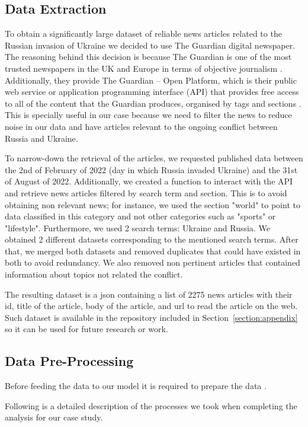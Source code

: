 \documentclass[twoside,12pt,a4paper]{article}
\begin{document}
\subsection{Data Extraction}
To obtain a significantly large dataset of reliable news articles related to the Russian invasion of Ukraine we decided to use The Guardian digital newspaper. The reasoning behind this decision is because The Guardian is one of the most trusted newspapers in the UK and Europe in terms of objective journalism \citep{matsa_western_2018}. Additionally, they provide The Guardian – Open Platform, which is their public web service or application programming interface (API) that provides free access to all of the content that the Guardian produces, organised by tags and sections \citep{noauthor_theguardian_nodate}. This is specially useful in our case because we need to filter the news to reduce noise in our data and have articles relevant to the ongoing conflict between Russia and Ukraine.

To narrow-down the retrieval of the articles, we requested published data between the 2nd of February of 2022 (day in which Russia invaded Ukraine) and the 31st of August of 2022. Additionally, we created a function to interact with the API and retrieve news articles filtered by search term and section. This is to avoid obtaining non relevant news; for instance, we used the section "world" to point to data classified in this category and not other categories such as "sports" or "lifestyle". Furthermore, we used 2 search terms: Ukraine and Russia. We obtained 2 different datasets corresponding to the mentioned search terms. After that, we merged both datasets and removed duplicates that could have existed in both to avoid redundancy. We also removed non pertinent articles that contained information about topics not related the conflict.

The resulting dataset is a json containing a list of 2275 news articles with their id, title of the article, body of the article, and url to read the article on the web. Such dataset is available in the repository included in Section~\ref{section:appendix} so it can be used for future research or work.

\subsection{Data Pre-Processing}
Before feeding the data to our model it is required to prepare the data \citep{jacobi_quantitative_2016}.

Following is a detailed description of the processes we took when completing the analysis for our case study. 
\end{document}
